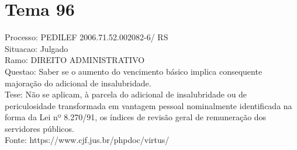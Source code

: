\documentclass[12pt]{article}
\begin{document}
\section*{Tema 96}
Processo: PEDILEF 2006.71.52.002082-6/ RS\\
Situacao: Julgado\\
Ramo: DIREITO ADMINISTRATIVO\\
Questao: Saber se o aumento do vencimento básico implica consequente majoração do adicional de insalubridade.\\
Tese: Não se aplicam, à parcela do adicional de insalubridade ou de periculosidade transformada em vantagem pessoal nominalmente identificada na forma da Lei nº 8.270/91, os índices de revisão geral de remuneração dos servidores públicos.\\
Fonte: https://www.cjf.jus.br/phpdoc/virtus/
\end{document}

